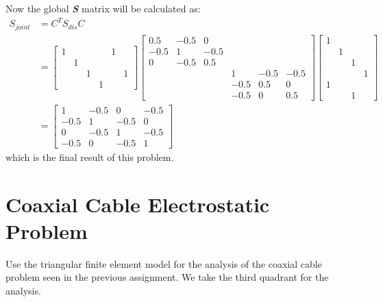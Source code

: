 \documentclass[a4paper,titlepage]{article}
\begin{document}
		Now the global \textbf{\textit{S}} matrix will be calculated as:
		\begin{align*}
			S_{joint} &= C^TS_{dis}C \\
			&= 
			\begin{bmatrix}
				1&&&&1&\\
				&1&&&&\\
				&&1&&&1\\
				&&&1&&
			\end{bmatrix}
			\begin{bmatrix}
				0.5 & -0.5 & 0 & & & \\
				-0.5 & 1 & -0.5 & & & \\
				0 & -0.5 & 0.5 & & & \\
				& & & 1 & -0.5 & -0.5 \\
				& & & -0.5 & 0.5 & 0 \\
				& & & -0.5 & 0 & 0.5
			\end{bmatrix}
			\begin{bmatrix}
				1&&&\\
				&1&&\\
				&&1&\\
				&&&1\\
				1&&&\\
				&&1&
			\end{bmatrix}\\
			&= \begin{bmatrix}
				1 & -0.5 & 0 & -0.5\\
				-0.5 & 1 & -0.5 & 0\\
				0 & -0.5 & 1 & -0.5\\
				-0.5 & 0 & -0.5 & 1
			\end{bmatrix}
		\end{align*}
		which is the final result of this problem.
	\section{Coaxial Cable Electrostatic Problem}
		Use the triangular finite element model for the analysis of the coaxial cable problem seen in the previous assignment. We take the third quadrant for the analysis. 
\end{document}
